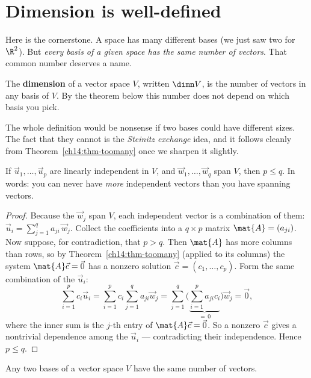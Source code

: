 \section{Dimension is well-defined}
\label{ch14:dim}

Here is the cornerstone. A space has many different bases (we just saw two for
$\R^2$). But \emph{every basis of a given space has the same number of vectors}.
That common number deserves a name.

\begin{definition}[Dimension]
\label{ch14:def-dim}
The \textbf{dimension} of a vector space $V$, written $\dimn V$, is the number of
vectors in any basis of $V$. By the theorem below this number does not depend on
which basis you pick.
\end{definition}

The whole definition would be nonsense if two bases could have different sizes.
The fact that they cannot is the \emph{Steinitz exchange} idea, and it follows
cleanly from Theorem~\ref{ch14:thm-toomany} once we sharpen it slightly.

\begin{lemma}
\label{ch14:lem-steinitz}
If $\vec{u}_1,\dots,\vec{u}_p$ are linearly independent in $V$, and
$\vec{w}_1,\dots,\vec{w}_q$ span $V$, then $p \le q$. In words: you can never
have \emph{more} independent vectors than you have spanning vectors.
\end{lemma}

\begin{proof}
Because the $\vec{w}_j$ span $V$, each independent vector is a combination of
them: $\vec{u}_i = \sum_{j=1}^{q} a_{ji}\,\vec{w}_j$. Collect the coefficients
into a $q \times p$ matrix $\mat{A}=(a_{ji})$. Now suppose, for contradiction,
that $p > q$. Then $\mat{A}$ has more columns than rows, so by
Theorem~\ref{ch14:thm-toomany} (applied to its columns) the system
$\mat{A}\vec{c}=\vec{0}$ has a nonzero solution $\vec{c}=(c_1,\dots,c_p)$. Form
the same combination of the $\vec{u}_i$:
\[
  \sum_{i=1}^{p} c_i \vec{u}_i
  = \sum_{i=1}^{p} c_i \sum_{j=1}^{q} a_{ji}\vec{w}_j
  = \sum_{j=1}^{q}\Big(\underbrace{\textstyle\sum_{i=1}^{p} a_{ji} c_i}_{=\,0}\Big)\vec{w}_j
  = \vec{0},
\]
where the inner sum is the $j$-th entry of $\mat{A}\vec{c}=\vec{0}$. So a nonzero
$\vec{c}$ gives a nontrivial dependence among the $\vec{u}_i$ ---
contradicting their independence. Hence $p \le q$.
\end{proof}

\begin{theorem}
\label{ch14:thm-dim}
Any two bases of a vector space $V$ have the same number of vectors.
\end{theorem}

